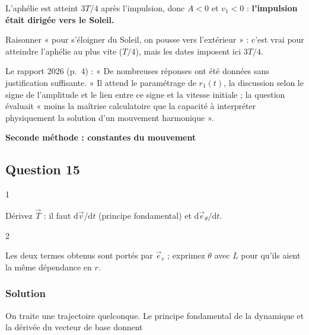 \documentclass[11pt,a4paper]{article}
\begin{document}
L'aphélie est atteint \(3T/4\) après l'impulsion, donc \(A<0\) et \(v_1<0\) : \textbf{l'impulsion était dirigée vers le Soleil.}

\begin{piege}

Raisonner « pour s'éloigner du Soleil, on pousse vers l'extérieur » : c'est vrai pour atteindre l'aphélie au plus vite (\(T/4\)), mais les dates imposent ici \(3T/4\).

\end{piege}

\begin{jury}

Le rapport 2026 (p.~4) : « De nombreuses réponses ont été données sans justification suffisante. » Il attend le paramétrage de \(r_1(t)\), la discussion selon le signe de l'amplitude et le lien entre ce signe et la vitesse initiale ; la question évaluait « moins la maîtrise calculatoire que la capacité à interpréter physiquement la solution d'un mouvement harmonique ».

\end{jury}

\textbf{Seconde méthode : constantes du mouvement}

\hypertarget{question-15}{%
\subsection{Question 15}\label{question-15}}

\begin{indication}{1}

Dérivez \(\vec T\) : il faut \(\mathrm d\vec v/\mathrm dt\) (principe fondamental) et \(\mathrm d\vec e_\theta/\mathrm dt\).

\end{indication}

\begin{indication}{2}

Les deux termes obtenus sont portés par \(\vec e_r\) ; exprimez \(\dot\theta\) avec \(L\) pour qu'ils aient la même dépendance en \(r\).

\end{indication}

\hypertarget{solution-14}{%
\subsubsection{Solution}\label{solution-14}}

On traite une trajectoire quelconque. Le principe fondamental de la dynamique et la dérivée du vecteur de base donnent
\end{document}
